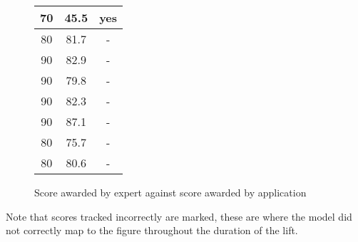 \begin{figure}[H]
\begin{tabular}{ | c | c | c | }
		70 & 45.5 & yes \\ \hline
		80 & 81.7 & - \\ \hline
		90 & 82.9 & - \\ \hline
		90 & 79.8 & - \\ \hline
		90 & 82.3 & - \\ \hline
		90 & 87.1 & - \\ \hline
		80 & 75.7 & - \\ \hline
		80 & 80.6 & - \\ \hline 
    \end{tabular}
\caption{Score awarded by expert against score awarded by application}
\label{fig:analysisevalscores2}
\end{figure}

Note that scores tracked incorrectly are marked, these are where the model did not correctly map to the figure throughout the duration of the lift.